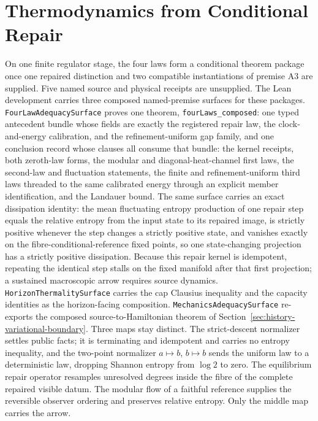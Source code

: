 \documentclass[11pt]{article}
\begin{document}
\section{Thermodynamics from Conditional Repair}
\label{sec:thermodynamics}

On one finite regulator stage, the four laws form a conditional theorem
package once one repaired distinction and two compatible instantiations of
premise A3 are supplied. Five named source and physical receipts are unsupplied.
The Lean development carries three composed named-premise surfaces for
these packages. \texttt{FourLawAdequacySurface} proves one theorem,
\texttt{fourLaws\_composed}: one typed antecedent bundle whose fields
are exactly the registered repair law, the clock-and-energy
calibration, and the refinement-uniform gap family, and one conclusion
record whose clauses all consume that bundle: the kernel receipts,
both zeroth-law forms, the modular and diagonal-heat-channel first
laws, the second-law and fluctuation statements, the finite and
refinement-uniform third laws threaded to the same calibrated energy
through an explicit member identification, and the Landauer bound.
The same surface carries an exact dissipation identity: the mean
fluctuating entropy production of one repair step equals the relative
entropy from the input state to its repaired image, is strictly
positive whenever the step changes a strictly positive state, and
vanishes exactly on the fibre-conditional-reference fixed points, so
one state-changing projection has a strictly positive dissipation. Because this repair kernel is idempotent,
repeating the identical step stalls on the fixed manifold after that first
projection; a sustained macroscopic arrow requires source dynamics.
\texttt{HorizonThermalitySurface} carries the cap
Clausius inequality and the capacity identities as the horizon-facing
composition. \texttt{MechanicsAdequacySurface} re-exports the composed
source-to-Hamiltonian theorem of
Section~\ref{sec:history-variational-boundary}.
Three maps stay distinct. The strict-descent normalizer settles
public facts; it is terminating and idempotent and carries no entropy
inequality, and the two-point normalizer \(a\mapsto b\), \(b\mapsto b\)
sends the uniform law to a deterministic law, dropping Shannon entropy
from \(\log 2\) to zero. The equilibrium repair operator resamples
unresolved degrees inside the fibre of the complete repaired visible
datum. The modular flow of a faithful reference supplies the reversible
observer ordering and preserves relative entropy. Only the middle map
carries the arrow.
\end{document}
